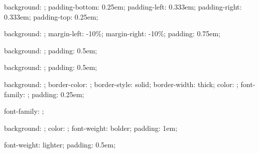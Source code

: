 %
{%
  background: \@getcolor{\geeknotebackgroundcolor};
  padding-bottom: 0.25em;
  padding-left: 0.333em;
  padding-right: 0.333em;
  padding-top: 0.25em;
}




%
{%
  background: \@getcolor{\sectionbackgroundcolor};
  margin-left: -10\%;
  margin-right: -10\%;
  padding: 0.75em;
}


%
{%
  background: \@getcolor{\subsectionbackgroundcolor};
  padding: 0.5em;
}


%
{%
  background: \@getcolor{\subsubsectionbackgroundcolor};
  padding: 0.5em;
}


%
{%
  background: \@getcolor{\terminalbackgroundcolor};
  border-color: \@getcolor{\terminalbordercolor};
  border-style: solid;
  border-width: thick;
  color: \@getcolor{\terminalcolor};
  font-family: \fixedfontfamily;
  padding: 0.25em;
}


{
  font-family: \sansfontfamily;
}


%
{%
  background: \@getcolor{\titlebackgroundcolor};
  color: \@getcolor{\titleforegroundcolor};
  font-weight: bolder;
  padding: 1em;
}


%
{%
  font-weight: lighter;
  padding: 0.5em;
}


